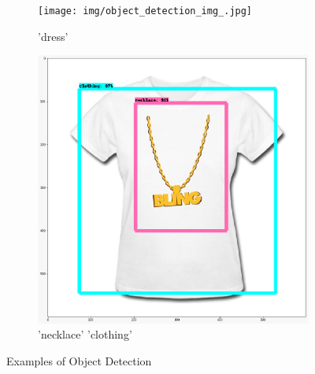 \documentclass[twocolumn]{article}
\begin{document}
    	\begin{figure}
          \begin{subfigure}[b]{0.4\columnwidth}
            \texttt{[image: img/object\_detection\_img\_.jpg]}
            \caption{'dress'}
            \label{fig:object_dress}
          \end{subfigure}
          \hfill %
          \begin{subfigure}[b]{0.4\columnwidth}
            \includegraphics[width=\linewidth]{img/t_shirt_object_detection.jpeg}
            \caption{'necklace' 'clothing'}
            \label{fig:object_necklace_clothing}
          \end{subfigure}
          \caption{Examples of Object Detection}
        \end{figure}
        
\end{document}
